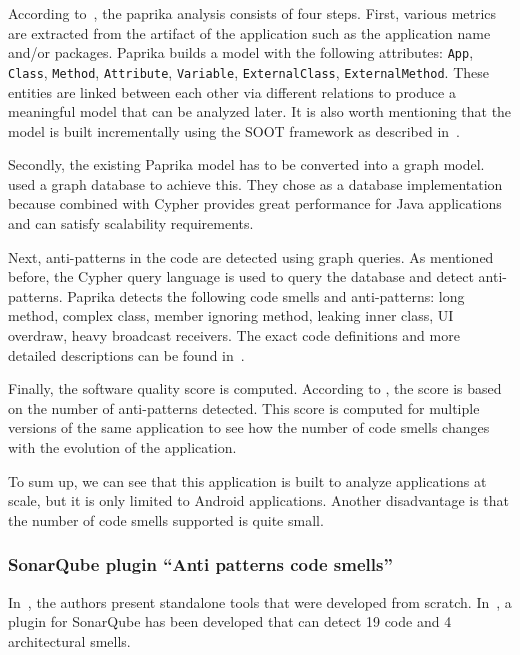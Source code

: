 According to~\citeauthor{paprika-paper}, the paprika analysis consists of four steps.
First, various metrics are extracted from the artifact of the application such as the application name and/or packages.
Paprika builds a model with the following attributes: \texttt{App}, \texttt{Class}, \texttt{Method}, \texttt{Attribute},
\texttt{Variable}, \texttt{ExternalClass}, \texttt{ExternalMethod}.
These entities are linked between each other via different relations to produce a meaningful model that can be
analyzed later.
It is also worth mentioning that the model is built incrementally using the SOOT framework as described in~\cite{paprika-paper}.

Secondly, the existing Paprika model has to be converted into a graph model.
~\citeauthor{paprika-paper} used a graph database to achieve this.
They chose \citet{neo4j} as a database implementation because \citet{neo4j} combined with
Cypher provides great performance for Java applications and can satisfy scalability requirements.

Next, anti-patterns in the code are detected using graph queries.
As mentioned before, the Cypher query language is used to query the database and detect anti-patterns.
Paprika detects the following code smells and anti-patterns: long method, complex class, member ignoring method,
leaking inner class, UI overdraw, heavy broadcast receivers.
The exact code definitions and more detailed descriptions can be found in~\cite{paprika-paper}.

Finally, the software quality score is computed.
According to \citeauthor{paprika-paper}, the score is based on the number of anti-patterns detected.
This score is computed for multiple versions of the same application to see how the number of code smells changes with the evolution
of the application.

To sum up, we can see that this application is built to analyze applications at scale, but it is only limited
to Android applications.
Another disadvantage is that the number of code smells supported is quite small.

\subsubsection{SonarQube plugin ``Anti patterns code smells''}

In~\cite{mannan2016understanding,paprika-paper}, the authors present standalone tools that
were developed from scratch.
In~\cite{sonar-plugin-external}, a plugin for SonarQube has been developed that can detect 19 code and 4
architectural smells.

